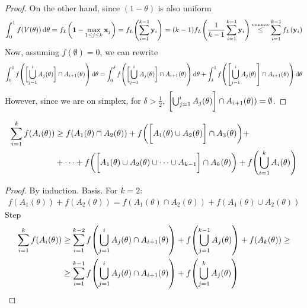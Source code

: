 \begin{lemma}
\begin{proof}
		On the other hand, since $(1-\theta)$ is also uniform 
		\begin{align}
		\int_{0}^1 f(V(\theta)) \dd{\theta}= f_L\qty(\vb{1} - \max\limits_{1\leq j \leq k} \vb{x}_j) = f_L\qty(\sum_{i=1}^{k-1} \vb{y}_i)= (k-1)f_L\qty(\frac{1}{k-1}\sum_{i=1}^{k-1} \vb{y}_i) \stackrel{\text{convex}}{\leq} \sum_{i=1}^{k-1}f_L\qty( \vb{y}_i)
		\end{align}
		Now, assuming $f(\emptyset) = 0$, we can rewrite
		\begin{align}
		\int_0^1 f\qty(\qty\bigg[ \bigcup_{j=1}^{i} A_j(\theta)] \cap A_{i+1}(\theta)) \dd{\theta} = \int_0^\delta f\qty(\qty\bigg[ \bigcup_{j=1}^{i} A_j(\theta)] \cap A_{i+1}(\theta)) \dd{\theta} + \int_\delta^1 f\qty(\qty[ \bigcup_{j=1}^{i} A_j(\theta)] \cap A_{i+1}(\theta)) \dd{\theta}
		\end{align}
		However, since we are on simplex, for $\delta>\frac{1}{2}$, $\qty\bigg[ \bigcup_{j=1}^{i} A_j(\theta)] \cap A_{i+1}(\theta)) =\emptyset$.
	\end{proof}
\end{lemma}
\begin{lemma}\label{th:delta_lemma2}
	\begin{align}
	\sum_{i=1}^k f(A_i(\theta)) &\geq f(A_1(\theta) \cap A_2(\theta)) + f\qty(\qty\bigg[A_1(\theta) \cup A_2(\theta)] \cap A_3(\theta)) +\\&+ \dots + f\qty(\qty\bigg[A_1(\theta) \cup A_2(\theta) \cup \dots \cup A_{k-1}] \cap A_k(\theta)) + f\qty(\bigcup_{i=1}^k A_i(\theta) ) 
	\end{align}
	\begin{proof}
		By induction. Basis. For $k=2$:
		\begin{align}
		f(A_1(\theta))+f(A_2(\theta)) = f(A_1(\theta) \cap A_2(\theta)) +f(A_1(\theta) \cup A_2(\theta)) 
		\end{align}
		Step
		\begin{align}
			\sum_{i=1}^k f(A_i(\theta)) &\geq \sum_{i=1}^{k-2} f\qty(\bigcup_{j=1}^i A_j(\theta) \cap A_{i+1}(\theta)) + f\qty(\bigcup_{j=1}^{k-1} A_{j}(\theta)) + f(A_k(\theta)) \geq\\&\geq  \sum_{i=1}^{k-1} f\qty(\bigcup_{j=1}^i A_j(\theta) \cap A_{i+1}(\theta))+ f\qty(\bigcup_{j=1}^{k} A_{j}(\theta))  
		\end{align}
	\end{proof}
\end{lemma}
